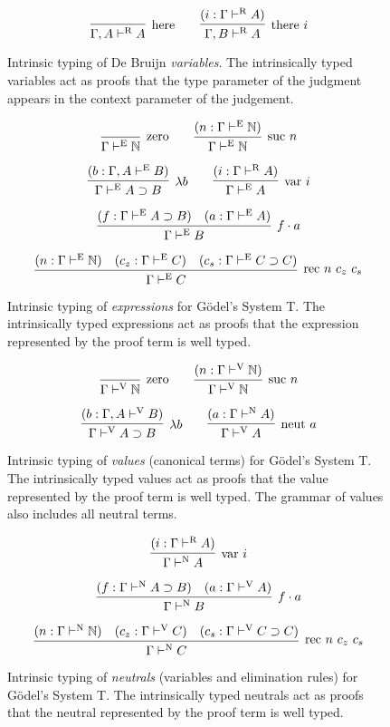 \documentclass{llncs}
\def\arr{\supset}
\def\app{\cdot}
\def\lam{\lambda}
\def\nat{\mathbb{N}}
\newcommand{\turn}[1]{\vdash^\con{#1}}
\newcommand{\con}[1]{\textmd{#1}}
\newcommand{\fun}[1]{\textmd{#1}}
\newcommand{\type}[1]{\Gamma \turn{E} #1}
\newcommand{\ctype}[2]{\Gamma , #1 \turn{E} #2}
\newcommand{\typv}[1]{\Gamma \turn{V} #1}
\newcommand{\ctypv}[2]{\Gamma , #1 \turn{V} #2}
\newcommand{\typn}[1]{\Gamma \turn{N} #1}
\newcommand{\typr}[1]{\Gamma \turn{R} #1}
\newcommand{\ctypr}[2]{\Gamma , #1 \turn{R} #2}
\begin{document}
\begin{figure}
\caption{
Intrinsic typing of De Bruijn \textit{variables}.
The intrinsically typed variables act as proofs that the type
parameter of the judgment appears in the context parameter of the
judgement.
}
$$
\infer
  [\con{here}]
  {\ctypr{A}{A}}
{
}
\qquad
\infer
  [\con{there} ~ i]
  {\ctypr{B}{A}}
{
  (i : \typr{A})
}
$$
\label{fig:typr}
\end{figure}

\begin{figure}
\caption{
Intrinsic typing of \textit{expressions} for G{\"o}del's System T. The
intrinsically typed expressions act as proofs that the expression
represented by the proof term is well typed.
}
$$
\infer
  [\con{zero}]
  {\type{\nat}}
{}
\qquad
\infer
  [\con{suc} ~ n]
  {\type{\nat}}
{
  (n : \type{\nat})
}
$$

$$
\infer
  [\lam b]
  {\type{A \arr B}}
{
  (b : \ctype{A}{B})
}
\qquad
\infer
  [\fun{var} ~ i]
  {\type{A}}
{
  (i : \typr{A})
}
$$

$$
\infer
  [f \app a]
  {\type{B}}
{
  (f : \type{A \arr B})
  &
  (a : \type{A})
}
$$

$$
\infer
  [\fun{rec} ~ n ~ c_z ~ c_s]
  {\type{C}}
{
  (n : \type{\nat})
  &
  (c_z : \type{C})
  &
  (c_s : \type{C \arr C})
}
$$
\label{fig:type}
\end{figure}

\begin{figure}
\caption{
Intrinsic typing of \textit{values} (canonical terms) for G{\"o}del's System T.
The intrinsically typed values act as proofs that the value
represented by the proof term is well typed. The grammar of values
also includes all neutral terms.
}
$$
\infer
  [\con{zero}]
  {\typv{\nat}}
{}
\qquad
\infer
  [\con{suc} ~ n]
  {\typv{\nat}}
{
  (n : \typv{\nat})
}
$$

$$
\infer
  [\lam b]
  {\typv{A \arr B}}
{
  (b : \ctypv{A}{B})
}
\qquad
\infer
  [\fun{neut} ~ a]
  {\typv{A}}
{
  (a : \typn{A})
}
$$
\label{fig:typv}
\end{figure}

\begin{figure}
\caption{
Intrinsic typing of \textit{neutrals} (variables and elimination rules) 
for G{\"o}del's System T.
The intrinsically typed neutrals act as proofs that the neutral
represented by the proof term is well typed.
}

$$
\infer
  [\fun{var} ~ i]
  {\typn{A}}
{
  (i : \typr{A})
}
$$

$$
\infer
  [f \app a]
  {\typn{B}}
{
  (f : \typn{A \arr B})
  &
  (a : \typv{A})
}
$$

$$
\infer
  [\fun{rec} ~ n ~ c_z ~ c_s]
  {\typn{C}}
{
  (n : \typn{\nat})
  &
  (c_z : \typv{C})
  &
  (c_s : \typv{C \arr C})
}
$$
\label{fig:typn}
\end{figure}
\end{document}
